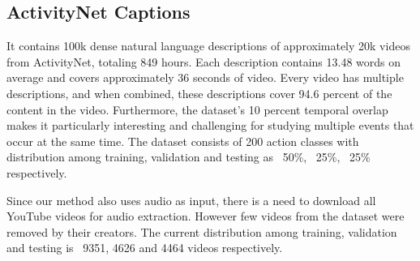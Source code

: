 \subsection{ActivityNet Captions}

\par It contains 100k dense natural language descriptions of approximately 20k videos from ActivityNet, totaling 849 hours. Each description contains 13.48 words on average and covers approximately 36 seconds of video. Every video has multiple descriptions, and when combined, these descriptions cover 94.6 percent of the content in the video. Furthermore, the dataset's 10 percent temporal overlap makes it particularly interesting and challenging for studying multiple events that occur at the same time. The dataset consists of 200 action classes with distribution among training, validation and testing as ~50\%, ~25\%, ~25\% respectively.   \cite{krishna2017densecaptioning}
\par Since our method also uses audio as input, there is a need to download all YouTube videos for audio extraction. However few videos from the dataset were removed by their creators. The current distribution among training, validation and testing is ~9351, 4626 and 4464 videos respectively.


\inputminted[frame=lines,framesep=2mm,baselinestretch=1.2,label={Format of ActivityNet Captions dataset},labelposition=bottomline]{javascript}{assets/code/anet-captions.json}


